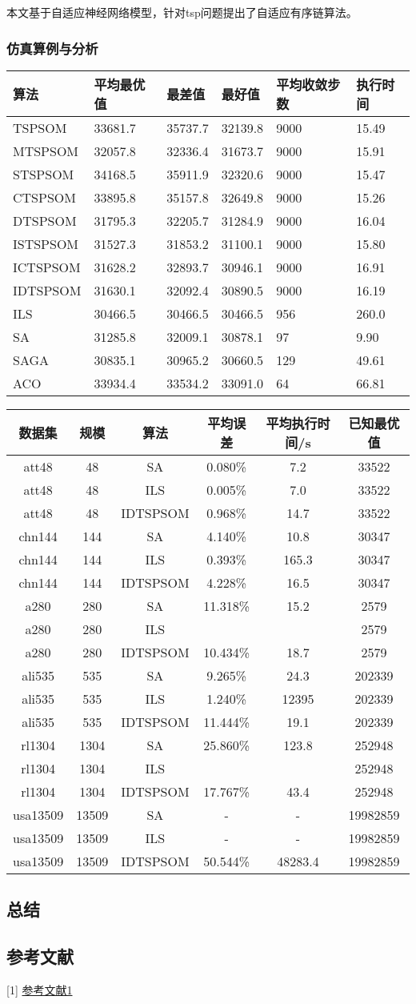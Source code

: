 本文基于自适应神经网络模型，针对tsp问题提出了自适应有序链算法。

\hypertarget{ux4effux771fux7b97ux4f8bux4e0eux5206ux6790-1}{%
\subsubsection{仿真算例与分析}\label{ux4effux771fux7b97ux4f8bux4e0eux5206ux6790-1}}

\begin{longtable}[]{@{}llllll@{}}
\toprule
算法 & 平均最优值 & 最差值 & 最好值 & 平均收敛步数 &
执行时间\tabularnewline
\midrule
\endhead
TSPSOM & 33681.7 & 35737.7 & 32139.8 & 9000 & 15.49\tabularnewline
MTSPSOM & 32057.8 & 32336.4 & 31673.7 & 9000 & 15.91\tabularnewline
STSPSOM & 34168.5 & 35911.9 & 32320.6 & 9000 & 15.47\tabularnewline
CTSPSOM & 33895.8 & 35157.8 & 32649.8 & 9000 & 15.26\tabularnewline
DTSPSOM & 31795.3 & 32205.7 & 31284.9 & 9000 & 16.04\tabularnewline
ISTSPSOM & 31527.3 & 31853.2 & 31100.1 & 9000 & 15.80\tabularnewline
ICTSPSOM & 31628.2 & 32893.7 & 30946.1 & 9000 & 16.91\tabularnewline
IDTSPSOM & 31630.1 & 32092.4 & 30890.5 & 9000 & 16.19\tabularnewline
ILS & 30466.5 & 30466.5 & 30466.5 & 956 & 260.0\tabularnewline
SA & 31285.8 & 32009.1 & 30878.1 & 97 & 9.90\tabularnewline
SAGA & 30835.1 & 30965.2 & 30660.5 & 129 & 49.61\tabularnewline
ACO & 33934.4 & 33534.2 & 33091.0 & 64 & 66.81\tabularnewline
\bottomrule
\end{longtable}

\begin{longtable}[]{@{}cccccc@{}}
\toprule
数据集 & 规模 & 算法 & 平均误差 & 平均执行时间/s &
已知最优值\tabularnewline
\midrule
\endhead
att48 & 48 & SA & 0.080\% & 7.2 & 33522\tabularnewline
att48 & 48 & ILS & 0.005\% & 7.0 & 33522\tabularnewline
att48 & 48 & IDTSPSOM & 0.968\% & 14.7 & 33522\tabularnewline
chn144 & 144 & SA & 4.140\% & 10.8 & 30347\tabularnewline
chn144 & 144 & ILS & 0.393\% & 165.3 & 30347\tabularnewline
chn144 & 144 & IDTSPSOM & 4.228\% & 16.5 & 30347\tabularnewline
a280 & 280 & SA & 11.318\% & 15.2 & 2579\tabularnewline
a280 & 280 & ILS & & & 2579\tabularnewline
a280 & 280 & IDTSPSOM & 10.434\% & 18.7 & 2579\tabularnewline
ali535 & 535 & SA & 9.265\% & 24.3 & 202339\tabularnewline
ali535 & 535 & ILS & 1.240\% & 12395 & 202339\tabularnewline
ali535 & 535 & IDTSPSOM & 11.444\% & 19.1 & 202339\tabularnewline
rl1304 & 1304 & SA & 25.860\% & 123.8 & 252948\tabularnewline
rl1304 & 1304 & ILS & & & 252948\tabularnewline
rl1304 & 1304 & IDTSPSOM & 17.767\% & 43.4 & 252948\tabularnewline
usa13509 & 13509 & SA & - & - & 19982859\tabularnewline
usa13509 & 13509 & ILS & - & - & 19982859\tabularnewline
usa13509 & 13509 & IDTSPSOM & 50.544\% & 48283.4 &
19982859\tabularnewline
\bottomrule
\end{longtable}

\hypertarget{ux603bux7ed3}{%
\subsection{总结}\label{ux603bux7ed3}}

\hypertarget{refer}{}

\hypertarget{ux53c2ux8003ux6587ux732e}{%
\subsection{参考文献}\label{ux53c2ux8003ux6587ux732e}}

{[}1{]}
\href{./参考文献/1Research\%20on\%20Task\%20Assignment\%20Optimization.pdf}{参考文献1}
